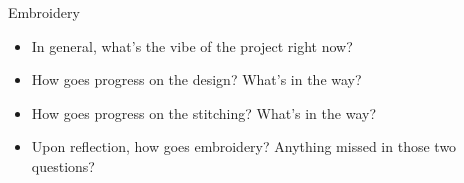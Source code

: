 
		\item Embroidery
		\begin{itemize}
			\item In general, what's the vibe of the project right now?
	
			\item How goes progress on the design? What's in the way?
	
			\item How goes progress on the stitching? What's in the way?
				
			\item Upon reflection, how goes embroidery? Anything missed in those two questions?
		\end{itemize}
